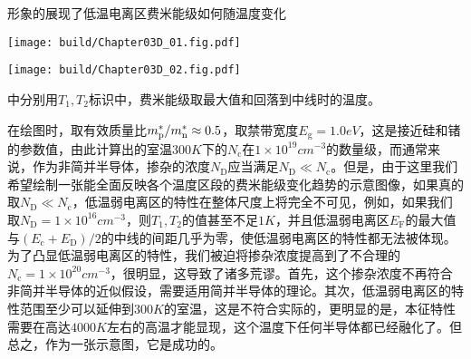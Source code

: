 形象的展现了低温电离区费米能级如何随温度变化
\begin{Figure}[杂质半导体的特性]
    \begin{FigureSub}[杂质半导体的费米能级]
        \texttt{[image: build/Chapter03D\_01.fig.pdf]}
    \end{FigureSub}
    \vspace{0.35cm}
    \begin{FigureSub}[杂质半导体的载流子浓度]
        \texttt{[image: build/Chapter03D\_02.fig.pdf]}
    \end{FigureSub}
\end{Figure}
中分别用$T_1,T_2$标识中，费米能级取最大值和回落到中线时的温度。

在绘图时，取有效质量比$m_\text{p}^{*}/m_\text{n}^{*}\approx 0.5$，取禁带宽度$E_\text{g}=1.0\si{eV}$，这是接近硅和锗的参数值，由此计算出的室温$300\si{K}$下的$N_\text{c}$在$1\times 10^{19}\si{cm^{-3}}$的数量级，而通常来说，作为非简并半导体，掺杂的浓度$N_\text{D}$应当满足$N_\text{D}\ll N_\text{c}$\;。但是，由于这里我们希望绘制一张能全面反映各个温度区段的费米能级变化趋势的示意图像，如果真的取$N_\text{D}\ll N_\text{c}$，低温弱电离区的特性在整体尺度上将完全不可见，例如，如果我们取$N_\text{D}=1\times 10^{16}\si{cm^{-3}}$，则$T_1,T_2$的值甚至不足$1\si{K}$，并且低温弱电离区$E_\text{F}$的最大值与$(E_\text{c}+E_\text{D})/2$的中线的间距几乎为零，使低温弱电离区的特性都无法被体现。为了凸显低温弱电离区的特性，我们被迫将掺杂浓度提高到了不合理的$N_\text{c}=1\times 10^{20}\si{cm^{-3}}$，很明显，这导致了诸多荒谬。首先，这个掺杂浓度不再符合非简并半导体的近似假设，需要适用简并半导体的理论。其次，低温弱电离区的特性范围至少可以延伸到$300\si{K}$的室温，这是不符合实际的，更明显的是，本征特性需要在高达$4000\si{K}$左右的高温才能显现，这个温度下任何半导体都已经融化了。但总之，作为一张示意图，它是成功的。

